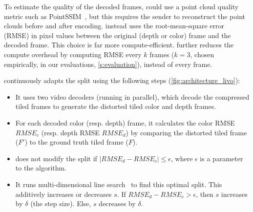 To estimate the quality of the decoded frames, \livo{} could use a point cloud quality metric such as PointSSIM~\cite{pointssim}, but this requires the sender to reconstruct the point clouds before and after encoding.
%
\livo{} instead uses the root-mean-square error (RMSE) in pixel values between the original (depth or color) frame and the decoded frame.
%
%
%
%
This choice is far more compute-efficient.
%
\livo{} further reduces the compute overhead by computing RMSE every $k$ frames ($k=3$, chosen empirically, in our evaluations, \cref{s:evaluation}), instead of every frame.


%
\livo{} continuously adapts the split using the following steps (\cref{fig:architecture_livo}):
\begin{itemize}
\item It uses two video decoders (running in parallel), which decode the compressed tiled frames to generate the distorted tiled color and depth frames.
\item For each decoded color (resp. depth) frame, it calculates the color RMSE $RMSE_c$ (resp. depth RMSE $RMSE_d$) by comparing the distorted tiled frame ($F'$) to the ground truth tiled frame ($F$).
\item \livo{} does not modify the split if $|RMSE_d - RMSE_c| \le \epsilon$, where $\epsilon$ is a parameter to the algorithm.
\item It runs multi-dimensional line search~\cite{linesearch-hauser,linesearch-bookchapter} to find this optimal split. This additively increases or decreases $s$. If $RMSE_d - RMSE_c > \epsilon$, then $s$ increases by $\delta$ (the step size). Else, $s$ decreases by $\delta$.
\end{itemize} %

